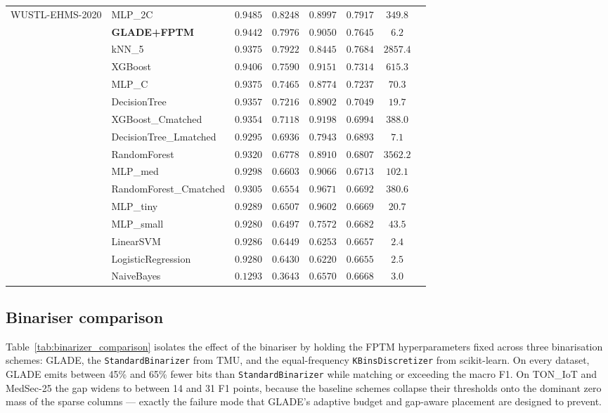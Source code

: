 \documentclass[journal,10pt]{IEEEtran}
\begin{document}
\begin{longtable}{llcccccr}
\multirow{16}{*}{WUSTL-EHMS-2020}
 & MLP\_2C                & $0.9485$ & $0.8248$ & $0.8997$ & $0.7917$ & $349.8$   \\
 & \textbf{GLADE+FPTM}    & $\mathbf{0.9442}$ & $\mathbf{0.7976}$ & $\mathbf{0.9050}$ & $\mathbf{0.7645}$ & $\mathbf{6.2}$ \\
 & kNN\_5                 & $0.9375$ & $0.7922$ & $0.8445$ & $0.7684$ & $2857.4$  \\
 & XGBoost                & $0.9406$ & $0.7590$ & $0.9151$ & $0.7314$ & $615.3$   \\
 & MLP\_C                 & $0.9375$ & $0.7465$ & $0.8774$ & $0.7237$ & $70.3$    \\
 & DecisionTree           & $0.9357$ & $0.7216$ & $0.8902$ & $0.7049$ & $19.7$    \\
 & XGBoost\_Cmatched      & $0.9354$ & $0.7118$ & $0.9198$ & $0.6994$ & $388.0$   \\
 & DecisionTree\_Lmatched & $0.9295$ & $0.6936$ & $0.7943$ & $0.6893$ & $7.1$     \\
 & RandomForest           & $0.9320$ & $0.6778$ & $0.8910$ & $0.6807$ & $3562.2$  \\
 & MLP\_med               & $0.9298$ & $0.6603$ & $0.9066$ & $0.6713$ & $102.1$   \\
 & RandomForest\_Cmatched & $0.9305$ & $0.6554$ & $0.9671$ & $0.6692$ & $380.6$   \\
 & MLP\_tiny              & $0.9289$ & $0.6507$ & $0.9602$ & $0.6669$ & $20.7$    \\
 & MLP\_small             & $0.9280$ & $0.6497$ & $0.7572$ & $0.6682$ & $43.5$    \\
 & LinearSVM              & $0.9286$ & $0.6449$ & $0.6253$ & $0.6657$ & $2.4$     \\
 & LogisticRegression     & $0.9280$ & $0.6430$ & $0.6220$ & $0.6655$ & $2.5$     \\
 & NaiveBayes             & $0.1293$ & $0.3643$ & $0.6570$ & $0.6668$ & $3.0$     \\

\end{longtable}
\twocolumn

\subsection{Binariser comparison}
\label{sec:res-binarisers}

Table~\ref{tab:binarizer_comparison} isolates the effect of the
binariser by holding the FPTM hyperparameters fixed across three
binarisation schemes: GLADE, the \texttt{StandardBinarizer} from TMU,
and the equal-frequency \texttt{KBinsDiscretizer} from scikit-learn.
On every dataset, GLADE emits between 45\% and 65\% fewer bits than
\texttt{StandardBinarizer} while matching or exceeding the macro F1.
On TON\_IoT and MedSec-25 the gap widens to between 14 and 31 F1
points, because the baseline schemes collapse their thresholds onto
the dominant zero mass of the sparse columns --- exactly the failure
mode that GLADE's adaptive budget and gap-aware placement are designed
to prevent.
\end{document}

